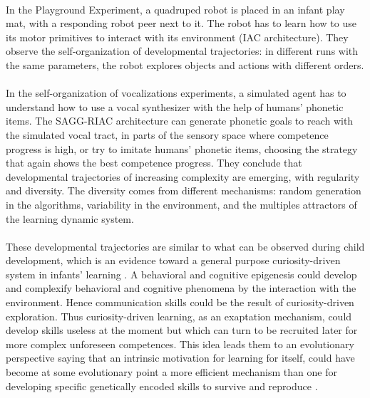 \documentclass[12pt]{article}
\begin{document}
		\paragraph{}%
		In the Playground Experiment, a quadruped robot is placed in an infant play mat, with a responding robot peer next to it. 
		The robot has to learn how to use its motor primitives to interact with its environment (IAC architecture). 
		They observe the self-organization of developmental	trajectories: in different runs with the same parameters, the robot explores objects and actions with 
		different orders.
		
		\paragraph{}%
		In the self-organization of vocalizations experiments, a simulated agent has to understand how to use a vocal synthesizer with the help of humans' phonetic items. The SAGG-RIAC architecture can generate phonetic goals to reach with the simulated vocal tract, in parts of the sensory space where competence progress is high, or try to imitate humans' phonetic items, choosing the strategy that again shows the best competence progress.
		They conclude that developmental trajectories of increasing complexity are emerging, with regularity and diversity.
		The diversity comes from different mechanisms: random generation in the algorithms, variability in the environment, and the multiples attractors
		of the learning dynamic system.
				
		\paragraph{}%
		These developmental trajectories are similar to what can be observed during child development, which is an evidence toward
		a general purpose curiosity-driven system in infants' learning \cite{oudeyer2014evolution}. 
		A behavioral and cognitive epigenesis could develop and complexify behavioral and 
		cognitive phenomena by the interaction with the environment. Hence communication skills could be the result of curiosity-driven exploration.
		Thus curiosity-driven learning, as an exaptation mechanism, could develop skills useless at the moment but which can turn to be recruited 
		later for more complex unforeseen competences.			
		This idea leads them to an evolutionary perspective saying that an intrinsic motivation for learning for itself, could have become at some evolutionary point a more efficient mechanism than one for developing specific genetically encoded skills to survive and reproduce \cite{oudeyer2014evolution}.
		
\end{document}
